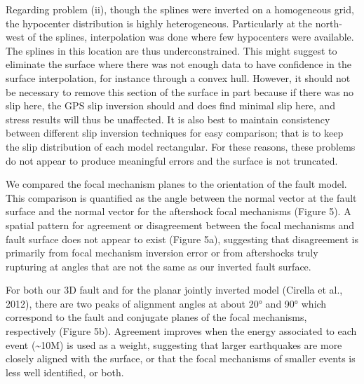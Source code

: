 \documentclass[11pt]{article}
\begin{document}
Regarding problem (ii), though the splines were inverted on a
homogeneous grid, the hypocenter distribution is highly heterogeneous.
Particularly at the north-west of the splines, interpolation was done
where few hypocenters were available. The splines in this location are
thus underconstrained. This might suggest to eliminate the surface where
there was not enough data to have confidence in the surface
interpolation, for instance through a convex hull. However, it should
not be necessary to remove this section of the surface in part because
if there was no slip here, the GPS slip inversion should and does find
minimal slip here, and stress results will thus be unaffected. It is
also best to maintain consistency between different slip inversion
techniques for easy comparison; that is to keep the slip distribution of
each model rectangular. For these reasons, these problems do not appear
to produce meaningful errors and the surface is not truncated.

We compared the focal mechanism planes to the orientation of the fault
model. This comparison is quantified as the angle between the normal
vector at the fault surface and the normal vector for the aftershock
focal mechanisms (Figure 5). A spatial pattern for agreement or
disagreement between the focal mechanisms and fault surface does not
appear to exist (Figure 5a), suggesting that disagreement is primarily
from focal mechanism inversion error or from aftershocks truly rupturing
at angles that are not the same as our inverted fault surface.

For both our 3D fault and for the planar jointly inverted model (Cirella
et al., 2012), there are two peaks of alignment angles at about 20° and
90° which correspond to the fault and conjugate planes of the focal
mechanisms, respectively (Figure 5b). Agreement improves when the energy
associated to each event (\textasciitilde{}10M) is used as a weight,
suggesting that larger earthquakes are more closely aligned with the
surface, or that the focal mechanisms of smaller events is less well
identified, or both.
\end{document}
